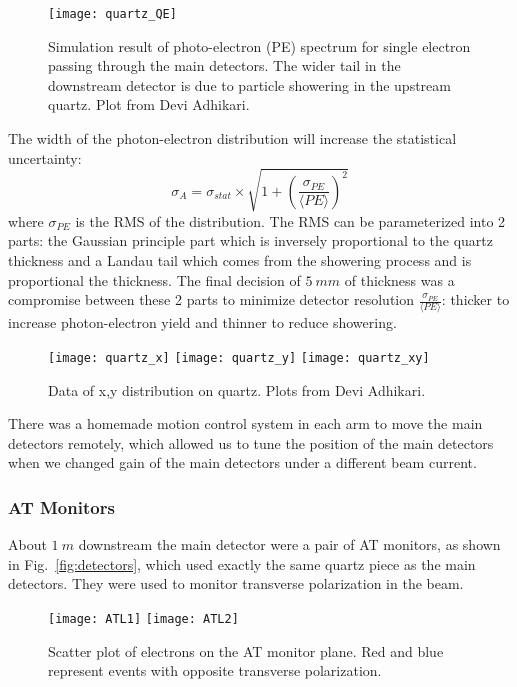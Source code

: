 \begin{figure}
    \centering
    \texttt{[image: quartz\_QE]}
    \caption{Simulation result of photo-electron (PE) spectrum for single electron
    passing through the main detectors. The wider tail in the downstream
    detector is due to particle showering in the upstream quartz.
    Plot from Devi Adhikari.}
\end{figure}
The width of the photon-electron distribution will increase
the statistical uncertainty:
\begin{equation}
    \sigma_{A} = \sigma_{stat} \times \sqrt{1 + \left( \frac{\sigma_{PE}}{\langle PE \rangle }\right)^2}
\end{equation}
where $\sigma_{PE}$ is the RMS of the distribution. The RMS can be parameterized
into 2 parts: the Gaussian principle part which is inversely proportional to
the quartz thickness and a Landau tail which comes from the showering process
and is proportional the thickness. The final decision of $5\ mm$ of thickness
was a compromise between these 2 parts to minimize detector resolution 
$\frac{\sigma_{PE}}{\langle PE \rangle}$: thicker to increase photon-electron
yield and thinner to reduce showering.

\begin{figure}
    \centering
    \texttt{[image: quartz\_x]}
    \texttt{[image: quartz\_y]}
    \texttt{[image: quartz\_xy]}
    \caption{Data of x,y distribution on quartz. Plots from Devi Adhikari.}
\end{figure}

There was a homemade motion control system in each arm to move the main detectors
remotely, which allowed us to tune the position of the main detectors when we
changed gain of the main detectors under a different beam current.


\subsubsection{AT Monitors}
About $1\ m$ downstream the main detector were a pair of AT monitors, as shown 
in Fig.~\ref{fig:detectors}, which used exactly the same quartz piece as the 
main detectors. They were used to monitor transverse polarization in the beam.
\begin{figure}[h!]
    \centering
    \texttt{[image: ATL1]}
    \texttt{[image: ATL2]}
    \caption{Scatter plot of electrons on the AT monitor plane. Red and blue represent
    events with opposite transverse polarization. 
    }
\end{figure}

